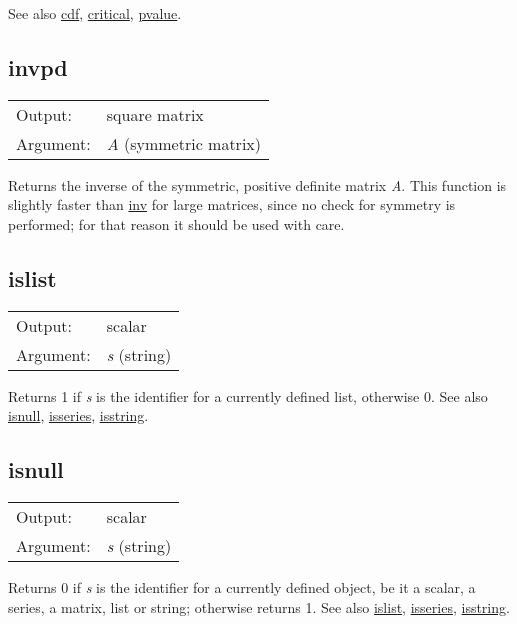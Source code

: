 	  See also \hyperlink{func-cdf}{cdf}, \hyperlink{func-critical}{critical}, \hyperlink{func-pvalue}{pvalue}.

\subsection{invpd}
\hypertarget{func-invpd}{}

\begin{tabular}{ll}
Output:     & square matrix\\
Argument:   & \textsl{A} (symmetric matrix)\\
\end{tabular}

	  Returns the inverse of the symmetric, positive definite matrix
	  \textsl{A}.   This function is slightly faster than
	  \hyperlink{func-inv}{inv} for large matrices, since no check for
	  symmetry is performed; for that reason it should be used with
	  care.

\subsection{islist}
\hypertarget{func-islist}{}

\begin{tabular}{ll}
Output:     & scalar\\
Argument:   & \textsl{s} (string)\\
\end{tabular}

	  Returns 1 if \textsl{s} is the identifier for a
	  currently defined list, otherwise 0.
	  See also \hyperlink{func-isnull}{isnull}, \hyperlink{func-isseries}{isseries}, \hyperlink{func-isstring}{isstring}.

\subsection{isnull}
\hypertarget{func-isnull}{}

\begin{tabular}{ll}
Output:     & scalar\\
Argument:   & \textsl{s} (string)\\
\end{tabular}

	  Returns 0 if \textsl{s} is the identifier for a
	  currently defined object, be it a scalar, a series, a matrix,
	  list or string; otherwise returns 1.
	  See also \hyperlink{func-islist}{islist}, \hyperlink{func-isseries}{isseries}, \hyperlink{func-isstring}{isstring}.

